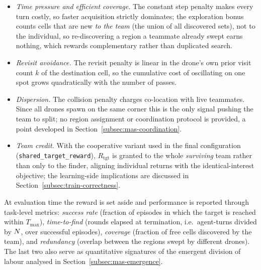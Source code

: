 \begin{itemize}[leftmargin=1.5em]
  \item \emph{Time pressure and efficient coverage.} The constant step penalty
    makes every turn costly, so faster acquisition strictly dominates; the
    exploration bonus counts cells that are new \emph{to the team} (the union of
    all discovered sets), not to the individual, so re-discovering a region a
    teammate already swept earns nothing, which rewards complementary rather than
    duplicated search.
  \item \emph{Revisit avoidance.} The revisit penalty is linear in the drone's
    own prior visit count $k$ of the destination cell, so the cumulative cost of
    oscillating on one spot grows quadratically with the number of passes.
  \item \emph{Dispersion.} The collision penalty charges co-location with live
    teammates. Since all drones spawn on the same corner this is the only signal
    pushing the team to split; no region assignment or coordination protocol is
    provided, a point developed in Section~\ref{subsec:mas-coordination}.
  \item \emph{Team credit.} With the cooperative variant used in the final
    configuration (\texttt{shared\_\allowbreak target\_\allowbreak reward}),
    $R_{\mathrm{tgt}}$ is granted
    to the whole \emph{surviving} team rather than only to the finder, aligning
    individual returns with the identical-interest objective; the learning-side
    implications are discussed in Section~\ref{subsec:train-correctness}.
\end{itemize}

At evaluation time the reward is set aside and performance is reported through
task-level metrics: \emph{success rate} (fraction of episodes in which the target
is reached within $T_{\max}$), \emph{time-to-find} (rounds elapsed at
termination, i.e.\ agent-turns divided by $N$, over successful episodes),
\emph{coverage} (fraction of free cells discovered by the team), and
\emph{redundancy} (overlap between the regions swept by different drones). The
last two also serve as quantitative signatures of the emergent division of labour
analysed in Section~\ref{subsec:mas-emergence}.
